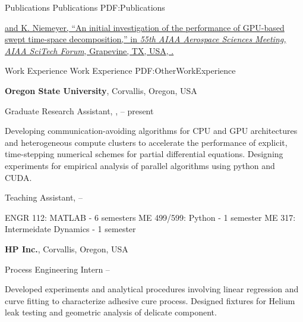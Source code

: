 \documentclass[letterpaper,MMMyyyy,nonstopmode]{simpleresumecv}
\begin{document}
\begin{Body}

\Section
{Publications}
{Publications}
{PDF:Publications}

\Gap
\href{https://arxiv.org/abs/1612.02495}
{\underline{} and K. Niemeyer,
``An initial investigation of the performance of GPU-based swept time-space decomposition,''
in \textit{55th AIAA Aerospace Sciences Meeting, AIAA SciTech Forum},
Grapevine, TX, USA,
.}


\Section
{Work Experience}
{Work Experience}
{PDF:OtherWorkExperience}

\Entry
\textbf{Oregon State University},
Corvallis, Oregon, USA

\BulletItem
Graduate Research Assistant,
\href{https://niemeyer-research-group.github.io}
{\underline{}},
\hfill
{} --
present

\begin{Detail}
\SubBulletItem
Developing communication-avoiding algorithms for CPU and GPU architectures and heterogeneous compute clusters to accelerate the performance of explicit, time-stepping numerical schemes for partial differential equations.
\SubBulletItem
Designing experiments for empirical analysis of parallel algorithms using python and CUDA.
\end{Detail}
\Gap

\BulletItem
Teaching Assistant,
\hfill
{} --

\begin{Detail}
\SubBulletItem
ENGR 112: MATLAB - 6 semesters 
\SubBulletItem
ME 499/599: Python - 1 semester
\SubBulletItem
ME 317: Intermeidate Dynamics - 1 semester
\end{Detail}
\BigGap

\Entry
\textbf{HP Inc.},
Corvallis, Oregon, USA

\BulletItem
Process Engineering Intern
\hfill
{} --

\begin{Detail}
\SubBulletItem
Developed experiments and analytical procedures involving linear regression and curve fitting to characterize adhesive cure process.
\SubBulletItem
Designed fixtures for Helium leak testing and geometric analysis of delicate component.
\end{Detail}
\BigGap


\end{Body}
\end{document}
